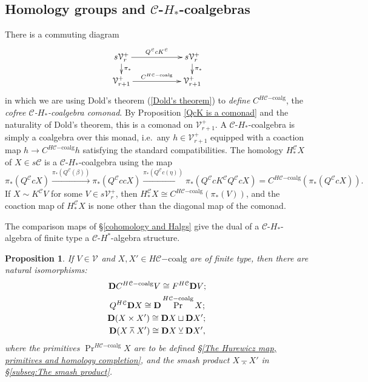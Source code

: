\documentclass[11pt]{amsart} \renewcommand{\baselinestretch}{1.4}
\theoremstyle{plain}
\newtheorem{prop}[thm]{Proposition}
\theoremstyle{definition}
\DeclareMathOperator{\Prim}{Pr}
\renewcommand{\to}{\longrightarrow}
\newcommand{\calV}{\mathcal{V}}
\newcommand{\calc}{\mathcal{C}}
\newcommand{\vect}[2]{\calV^{#1}_{#2}}
\newcommand{\HA}[1]{H#1}
\newcommand{\HC}[1]{H#1\mathrm{-coalg}}
\newcommand{\dual}{\mathbf{D}}
\newcommand{\smashprod}{\barwedge}%
\newcommand{\smashcoprod}{\veebar}%
\begin{document}
\begin{Pi-algebras and cohomology algebras}
\subsection{Homology groups and $\calc$-$H_*$-coalgebras}\label{homology and Hcoalgs}
There is a commuting diagram
\[\xymatrix@R=4mm@C=20mm{
s\vect{+}{r}\ar[r]^-{Q^\calc cK^\calc }
\ar[d]^-{\pi_*}
&%
s\vect{+}{r}\ar[d]^-{\pi_*}
\\%
\vect{+}{r+1}\ar[r]^-{C^{\HC{\calc}}}
&
\vect{+}{r+1}
}\]
in which we are using Dold's theorem (\ref{Dold's theorem}) to \emph{define} $C^{\HC{\calc}}$, the \emph{cofree $\calc$-$H_*$-coalgebra comonad}.
By Proposition \ref{QcK is a comonad} and the naturality of Dold's theorem, this is a comonad on $\vect{+}{r+1}$. A $\calc$-$H_*$-coalgebra is simply a coalgebra over this monad, i.e.\ any $h\in\vect{+}{r+1}$ equipped with a coaction map $h\to C^{\HC{\calc}}h$ satisfying the standard compatibilities. The homology $H_*^\calc X$ of $X\in s\calc$ is a $\calc$-$H_*$-coalgebra using the map
\[\pi_*(Q^{\calc}cX)\overset{\pi_*(Q^{\calc}(\beta))}{\to}\pi_*(Q^{\calc}ccX)\overset{\pi_*(Q^{\calc}c(\eta))}{\to}\pi_*(Q^{\calc}cK^{\calc}Q^{\calc}cX)=C^{\HC{\calc}}(\pi_*(Q^{\calc}cX)).\]
If $X\sim K^{\calc}V$ for some $V\in s\vect{+}{r}$, then $H_*^{\calc}X\cong C^{\HC{\calc}}(\pi_*(V))$, and the coaction map of $H_*^{\calc}X$ is none other than the diagonal map of the comonad.

The comparison maps of \S\ref{cohomology and Halgs} give the dual of a $\calc$-$H_*$-algebra of finite type a $\calc$-$H^*$-algebra structure. 
\begin{prop}
\label{something about dualization}
If $V\in \vect{}{}$ and $X,X'\in \HC{\calc}$ are of finite type, then there are natural isomorphisms:
\begin{gather*}
\dual C^{\HC{\calc}}V\cong F^{\HA{\calc}}\dual V;\\
Q^{\HA{\calc}}\dual X\cong \dual \Prim^{\HC{\calc}} X;\\
\dual(X\times X')\cong \dual X\sqcup \dual X';\makebox[0cm][l]{}\\
\dual(X\smashprod X')\cong \dual X\smashcoprod \dual X',
\end{gather*}
where the primitives $\Prim^{\HC{\calc}}X$ are to be defined \S\ref{The Hurewicz map, primitives and homology completion}, and the smash product $X\smashprod X'$ in \S\ref{subseq:The smash product}.
\end{prop}

\end{Pi-algebras and cohomology algebras}
\end{document}
